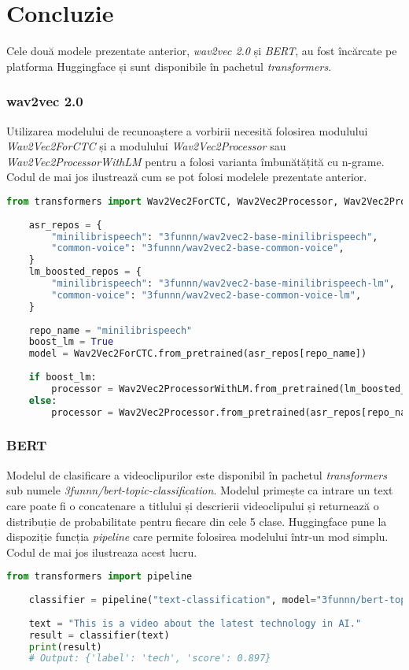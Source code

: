 \section{Concluzie}
Cele două modele prezentate anterior, \textit{wav2vec 2.0} și \textit{BERT}, au fost încărcate
pe platforma Huggingface și sunt disponibile în pachetul \textit{transformers}.

\subsubsection{wav2vec 2.0}
Utilizarea modelului de recunoaștere a vorbirii necesită folosirea modulului \textit{Wav2Vec2ForCTC}
și a modulului \textit{Wav2Vec2Processor} sau \textit{Wav2Vec2ProcessorWithLM} pentru a folosi varianta
îmbunătățită cu n-grame. Codul de mai jos ilustrează cum se pot folosi modelele prezentate anterior.

\begin{lstlisting}[language=Python]
    from transformers import Wav2Vec2ForCTC, Wav2Vec2Processor, Wav2Vec2ProcessorWithLM
    
    asr_repos = {
        "minilibrispeech": "3funnn/wav2vec2-base-minilibrispeech",
        "common-voice": "3funnn/wav2vec2-base-common-voice",
    }
    lm_boosted_repos = {
        "minilibrispeech": "3funnn/wav2vec2-base-minilibrispeech-lm",
        "common-voice": "3funnn/wav2vec2-base-common-voice-lm",
    }
    
    repo_name = "minilibrispeech"
    boost_lm = True
    model = Wav2Vec2ForCTC.from_pretrained(asr_repos[repo_name])
    
    if boost_lm:
        processor = Wav2Vec2ProcessorWithLM.from_pretrained(lm_boosted_repos[repo_name])
    else:
        processor = Wav2Vec2Processor.from_pretrained(asr_repos[repo_name])
    \end{lstlisting}


\subsubsection{BERT}
Modelul de clasificare a videoclipurilor este disponibil în pachetul \textit{transformers} sub numele
\textit{3funnn/bert-topic-classification}. Modelul primește ca intrare un text care poate fi o 
concatenare a titlului și descrierii videoclipului și returnează o distribuție de probabilitate
pentru fiecare din cele 5 clase. Huggingface pune la dispoziție funcția \textit{pipeline} care
permite folosirea modelului într-un mod simplu. Codul de mai jos ilustreaza acest lucru.

\begin{lstlisting}[language=Python]
    from transformers import pipeline
    
    classifier = pipeline("text-classification", model="3funnn/bert-topic-classification")
    
    text = "This is a video about the latest technology in AI."
    result = classifier(text)
    print(result)
    # Output: {'label': 'tech', 'score': 0.897}
\end{lstlisting}
